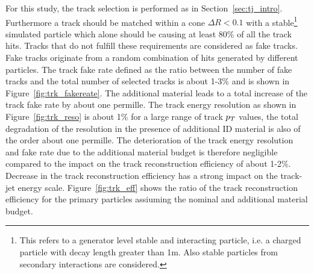 For this study, the track selection is performed as in Section~\ref{sec:tj_intro}. Furthermore a track should be 
matched within a cone $\Delta R <0.1$ with a stable\footnote{This refers to a generator level stable and interacting particle, i.e.
a charged particle with decay length greater than 1m. Also stable particles from secondary interactions are considered.} 
simulated particle which alone should be causing at least 80\% of all the track hits. Tracks that do not fulfill
these requirements are considered as fake tracks. 
Fake tracks originate from a random combination of hits generated by different particles.
The track fake rate defined as the ratio between the number of fake tracks and the total number of selected tracks  is about 1-3\% and is  
shown in Figure~\ref{fig:trk_fakereate}. The additional material leads to  
a total increase of the track fake rate by about one  permille. The track energy resolution 
as shown in Figure~\ref{fig:trk_reso} is about 1\% for a large range of track $p_{T}$ values, the total 
degradation of the resolution in the presence of additional ID material is also of the order about one  permille. 
The deterioration of the track energy resolution and fake rate due to the additional material budget  is therefore 
negligible compared to  the impact on the track reconstruction efficiency of about 1-2\%.
Decrease in the track reconstruction efficiency has a strong impact on the track-jet energy scale.
Figure~\ref{fig:trk_eff} shows the ratio of the track reconstruction
efficiency for the primary particles assiuming the nominal and additional material budget.


